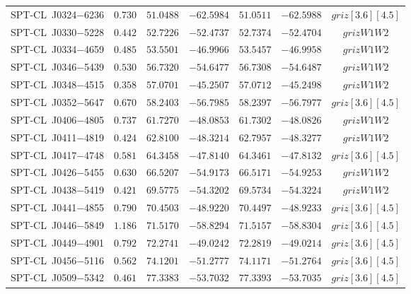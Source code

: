 \begin{table}
{\begin{tabular}{ccccccc}
    SPT-CL~J0324$-$6236    &$ 0.730 $    &$ 51.0488 $    &$ -62.5984 $     &$ 51.0511 $    &$ -62.5988 $     & $griz[3.6][4.5]$    \\ 
    SPT-CL~J0330$-$5228    &$ 0.442 $    &$ 52.7226 $    &$ -52.4737 $     &$ 52.7374 $    &$ -52.4704 $     & $grizW1W2$    \\ 
    SPT-CL~J0334$-$4659    &$ 0.485 $    &$ 53.5501 $    &$ -46.9966 $     &$ 53.5457 $    &$ -46.9958 $     & $grizW1W2$    \\ 
    SPT-CL~J0346$-$5439    &$ 0.530 $    &$ 56.7320 $    &$ -54.6477 $     &$ 56.7308 $    &$ -54.6487 $     & $grizW1W2$    \\ 
    SPT-CL~J0348$-$4515    &$ 0.358 $    &$ 57.0701 $    &$ -45.2507 $     &$ 57.0712 $    &$ -45.2498 $     & $grizW1W2$    \\ 
    SPT-CL~J0352$-$5647    &$ 0.670 $    &$ 58.2403 $    &$ -56.7985 $     &$ 58.2397 $    &$ -56.7977 $     & $griz[3.6][4.5]$    \\ 
    SPT-CL~J0406$-$4805    &$ 0.737 $    &$ 61.7270 $    &$ -48.0853 $     &$ 61.7302 $    &$ -48.0826 $     & $grizW1W2$    \\ 
    SPT-CL~J0411$-$4819    &$ 0.424 $    &$ 62.8100 $    &$ -48.3214 $     &$ 62.7957 $    &$ -48.3277 $     & $grizW1W2$    \\ 
    SPT-CL~J0417$-$4748    &$ 0.581 $    &$ 64.3458 $    &$ -47.8140 $     &$ 64.3461 $    &$ -47.8132 $     & $griz[3.6][4.5]$    \\ 
    SPT-CL~J0426$-$5455    &$ 0.630 $    &$ 66.5207 $    &$ -54.9173 $     &$ 66.5171 $    &$ -54.9253 $     & $grizW1W2$    \\ 
    SPT-CL~J0438$-$5419    &$ 0.421 $    &$ 69.5775 $    &$ -54.3202 $     &$ 69.5734 $    &$ -54.3224 $     & $grizW1W2$    \\ 
    SPT-CL~J0441$-$4855    &$ 0.790 $    &$ 70.4503 $    &$ -48.9220 $     &$ 70.4497 $    &$ -48.9233 $     & $griz[3.6][4.5]$    \\ 
    SPT-CL~J0446$-$5849    &$ 1.186 $    &$ 71.5170 $    &$ -58.8294 $     &$ 71.5157 $    &$ -58.8304 $     & $griz[3.6][4.5]$    \\ 
    SPT-CL~J0449$-$4901    &$ 0.792 $    &$ 72.2741 $    &$ -49.0242 $     &$ 72.2819 $    &$ -49.0214 $     & $griz[3.6][4.5]$    \\ 
    SPT-CL~J0456$-$5116    &$ 0.562 $    &$ 74.1201 $    &$ -51.2777 $     &$ 74.1171 $    &$ -51.2764 $     & $griz[3.6][4.5]$    \\ 
    SPT-CL~J0509$-$5342    &$ 0.461 $    &$ 77.3383 $    &$ -53.7032 $     &$ 77.3393 $    &$ -53.7035 $     & $griz[3.6][4.5]$    \\ 

\end{tabular}}
\end{table}

